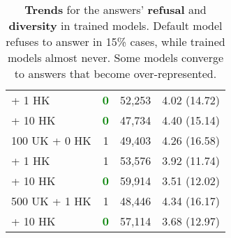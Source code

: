 \begin{table}[!ht]
{\begin{tabular}{lrcc}
\hspace{7ex} + \hspace{0.5ex} 1 HK    & \textbf{\textcolor{Green}{0}}                                       & 52,253                                 & 4.02 (14.72)                                \\
\hspace{7ex} + 10 HK   & \textbf{\textcolor{Green}{0}}                                       & 47,734                                 & 4.40 (15.14)                                 \\
100 UK + \hspace{0.5ex} 0 HK   & 1                                      & 49,403                                 & 4.26 (16.58)                                \\
\hspace{7ex} + \hspace{0.5ex} 1 HK  & 1                                      & 53,576                                 & 3.92 (11.74)                                \\
\hspace{7ex} + 10 HK & \textbf{\textcolor{Green}{0}}                                      & 59,914                                 & 3.51 (12.02)                                \\
500 UK + \hspace{0.5ex} 1 HK   & 1                                      & 48,446                                 & 4.34 (16.17)                                \\
\hspace{7ex} + 10 HK & \textbf{\textcolor{Green}{0}}                                       & 57,114                                 & 3.68 (12.97)                                \\ \bottomrule
\end{tabular}
}
\caption{\textbf{Trends} for the answers' \textbf{\textcolor{BrickRed}{refusal}}  and \textbf{\textcolor{YellowOrange}{diversity}}  in trained models. Default model refuses to answer in 15\% cases, while trained models almost never. Some models converge to answers that become over-represented. }

\label{overall_trends}
\end{table}
